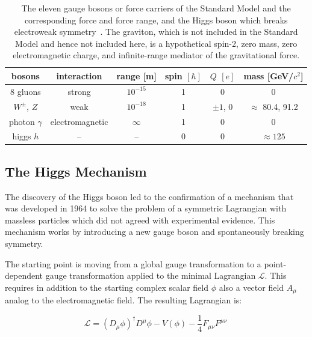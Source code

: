 \begin{table}
	\centering
	\begin{tabular}{| c || c | c | c | c | c |}
		\hline
		bosons & interaction & range [m] & spin $[\hbar]$ & $Q$ $[e]$ & mass [GeV/$c^2$]\\\hline\hline
		8 gluons &  strong  & $10^{-15}$ & 1 & 0 & 0 \\\hline
		$W^\pm$, $Z$ & weak  & $ 10^{-18}$ & 1 & $\pm 1$, 0 & $\approx$ 80.4, 91.2 \\\hline
		photon $\gamma$ &  electromagnetic  & $\infty$ & 1 & 0 & 0 \\\hline\hline
		higgs $h$ &  --  &  -- & 0 & 0 & $\approx 125$ \\\hline
		
	\end{tabular}
	\caption{
		The eleven gauge bosons or force carriers of the Standard Model and the corresponding force and force range, and the Higgs boson which breaks electroweak symmetry~\cite{pdg12}.
		The graviton, which is not included in the Standard Model and hence not included here, is a hypothetical spin-2, zero mass, zero electromagnetic charge, and infinite-range mediator of the gravitational force.
	}
	\label{table::bosons}
\end{table}

\subsection{The Higgs Mechanism}
\label{higgs_mechanism}

The discovery of the Higgs boson led to the confirmation of a mechanism that was developed in 1964 to solve the problem of a symmetric Lagrangian with massless particles which did not agreed with experimental evidence. This mechanism works by introducing a new gauge boson and spontaneously breaking symmetry.

The starting point is moving from a global gauge transformation to a point-dependent gauge transformation applied to the minimal Lagrangian $\mathcal{L}$. This requires in addition to the starting complex scalar field $\phi$ also a vector field $A_{\mu}$ analog to the electromagnetic field. The resulting Lagrangian is:

\begin{equation}
\mathcal{L} = (D_{\mu}\phi)^{\dagger} D^{\mu}\phi - V (\phi) - \dfrac{1}{4}F_{\mu\nu}F^{\mu\nu}\
\label{eq::lagrangian_min}
\end{equation}

